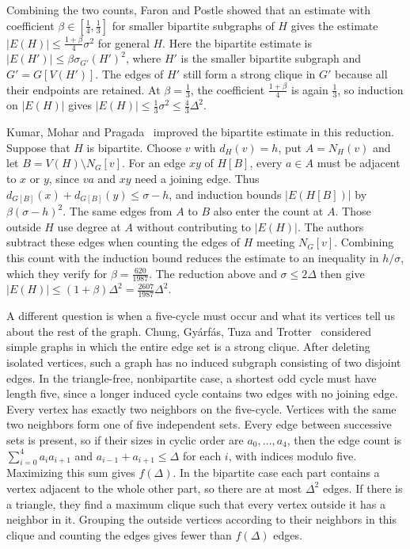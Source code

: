 \documentclass[preprint,11pt,numbers]{elsarticle-arxiv}
\numberwithin{equation}{section}
\theoremstyle{definition}
\begin{document}
Combining the two counts, Faron and Postle showed that an estimate
with coefficient $\beta\in[\frac{1}{4},\frac{1}{3}]$ for smaller
bipartite subgraphs of $H$ gives the estimate
$|E(H)|\leq\frac{1+\beta}{4}\sigma^2$ for general $H$.
Here the bipartite estimate is $|E(H')|\leq\beta\sigma_{G'}(H')^2$,
where $H'$ is the smaller bipartite subgraph and $G'=G[V(H')]$.
The edges of $H'$ still form a strong clique in $G'$ because all
their endpoints are retained. At $\beta=\frac{1}{3}$, the coefficient
$\frac{1+\beta}{4}$ is again $\frac{1}{3}$, so induction on $|E(H)|$
gives $|E(H)|\leq\frac{1}{3}\sigma^2\leq\frac{4}{3}\Delta^2$.

Kumar, Mohar and Pragada~\cite{KumarMoharPragada2026} improved the
bipartite estimate in this reduction. Suppose that $H$ is bipartite.
Choose $v$ with $d_H(v)=h$, put $A=N_H(v)$ and let
$B=V(H)\setminus N_G[v]$. For an edge $xy$ of $H[B]$, every
$a\in A$ must be adjacent to $x$ or $y$, since $va$ and $xy$ need
a joining edge. Thus $d_{G[B]}(x)+d_{G[B]}(y)\leq\sigma-h$,
and induction bounds $|E(H[B])|$ by $\beta(\sigma-h)^2$.
The same edges from $A$ to $B$ also enter the count at $A$.
Those outside $H$ use degree at $A$ without contributing to $|E(H)|$.
The authors subtract these edges when counting the edges of $H$
meeting $N_G[v]$. Combining this count with the induction bound
reduces the estimate to an inequality in $h/\sigma$, which they
verify for $\beta=\frac{620}{1987}$. The reduction above and
$\sigma\leq2\Delta$ then give
$|E(H)|\leq(1+\beta)\Delta^2=\frac{2607}{1987}\Delta^2$.

A different question is when a five-cycle must occur and what its
vertices tell us about the rest of the graph. Chung, Gy\'arf\'as,
Tuza and Trotter~\cite{CGTT1990} considered simple graphs in which
the entire edge set is a strong clique. After deleting isolated
vertices, such a graph has no induced subgraph consisting of two
disjoint edges. In the triangle-free, nonbipartite case, a shortest
odd cycle must have length five, since a longer induced cycle contains
two edges with no joining edge. Every vertex has exactly two neighbors
on the five-cycle. Vertices with the same two neighbors form one of
five independent sets. Every edge between successive sets is present,
so if their sizes in cyclic
order are $a_0,\ldots,a_4$, then the edge count is
$\sum_{i=0}^4 a_i a_{i+1}$ and $a_{i-1}+a_{i+1}\leq\Delta$ for
each $i$, with indices modulo five. Maximizing this sum gives
$f(\Delta)$. In the bipartite case each part contains a vertex
adjacent to the whole other part, so there are at most $\Delta^2$
edges. If there is a triangle, they find a maximum clique such that
every vertex outside it has a neighbor in it. Grouping the outside
vertices according to their neighbors in this clique and counting
the edges gives fewer than $f(\Delta)$ edges.
\end{document}
